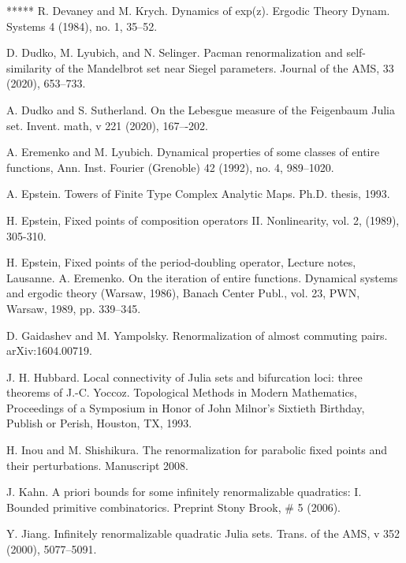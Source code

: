 \begin{thebibliography}{*****}
 R. Devaney and M. Krych. Dynamics of exp(z). Ergodic Theory Dynam. Systems 4 (1984), no. 1, 35--52.


 D. Dudko, M. Lyubich, and N. Selinger. Pacman renormalization and self-similarity of the Mandelbrot set near Siegel parameters.  Journal of the AMS, 33 (2020), 653--733.



 A. Dudko and S. Sutherland.  On the Lebesgue measure of the Feigenbaum Julia set. Invent. math, v 221 (2020), 167–-202. 
 





 A. Eremenko and M. Lyubich. Dynamical properties of some classes of entire functions, Ann. Inst. Fourier (Grenoble) 42 (1992), no. 4, 989--1020.

  A. Epstein. Towers of Finite Type Complex Analytic Maps. Ph.D. thesis, 1993.




 H. Epstein, Fixed points of composition operators II. Nonlinearity, vol. 2, (1989), 305-310.


 H. Epstein, Fixed points of the period-doubling operator, Lecture notes, Lausanne.
  A. Eremenko. On the iteration of entire functions. Dynamical systems and ergodic theory (Warsaw, 1986), Banach Center Publ., vol. 23, PWN, Warsaw, 1989, pp. 339--345.


 D. Gaidashev and M. Yampolsky. Renormalization of almost commuting pairs. arXiv:1604.00719. 


 J. H. Hubbard. Local connectivity of Julia sets and bifurcation loci: three theorems of J.-C. Yoccoz. Topological Methods in Modern Mathematics, Proceedings of a Symposium in Honor of John Milnor's Sixtieth Birthday, Publish or Perish, Houston, TX, 1993. 




 H. Inou and M. Shishikura.
  The renormalization for parabolic fixed points and their
  perturbations. Manuscript 2008. 
  
  
 J. Kahn. A priori bounds for some infinitely renormalizable quadratics: \RN{1}. Bounded primitive combinatorics. Preprint Stony Brook, \# 5 (2006).


  Y. Jiang. Infinitely renormalizable quadratic Julia sets. Trans. of the AMS, v 352 (2000), 5077--5091. 



\end{thebibliography}
